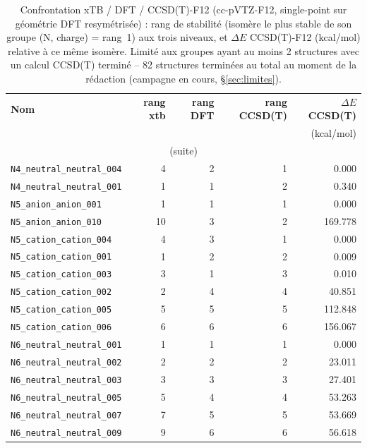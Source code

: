 {\scriptsize
\begin{longtable}{@{}p{4.0cm}rrrr@{}}
\caption{Confrontation xTB / DFT / CCSD(T)-F12 (cc-pVTZ-F12, single-point sur g\'eom\'etrie DFT resym\'etris\'ee) : rang de stabilit\'e (isom\`ere le plus stable de son groupe (N, charge) = rang~1) aux trois niveaux, et $\Delta E$ CCSD(T)-F12 (kcal/mol) relative \`a ce m\^eme isom\`ere. Limit\'e aux groupes ayant au moins 2 structures avec un calcul CCSD(T) termin\'e -- 82 structures termin\'ees au total au moment de la r\'edaction (campagne en cours, \S\ref{sec:limites}).}
\label{tab:ccsdt-comparison}\\
\toprule
\textbf{Nom} & \textbf{rang xtb} & \textbf{rang DFT} & \textbf{rang CCSD(T)} & \textbf{$\Delta E$ CCSD(T)} \\
 & & & & (kcal/mol) \\
\midrule\endfirsthead
\multicolumn{5}{c}{\small (suite)}\\ \toprule\endhead
\bottomrule\endfoot
\bottomrule\endlastfoot
\addlinespace
\texttt{N4\_neutral\_neutral\_004} & 4 & 2 & 1 & 0.000 \\
\texttt{N4\_neutral\_neutral\_001} & 1 & 1 & 2 & 0.340 \\
\addlinespace
\texttt{N5\_anion\_anion\_001} & 1 & 1 & 1 & 0.000 \\
\texttt{N5\_anion\_anion\_010} & 10 & 3 & 2 & 169.778 \\
\addlinespace
\texttt{N5\_cation\_cation\_004} & 4 & 3 & 1 & 0.000 \\
\texttt{N5\_cation\_cation\_001} & 1 & 2 & 2 & 0.009 \\
\texttt{N5\_cation\_cation\_003} & 3 & 1 & 3 & 0.010 \\
\texttt{N5\_cation\_cation\_002} & 2 & 4 & 4 & 40.851 \\
\texttt{N5\_cation\_cation\_005} & 5 & 5 & 5 & 112.848 \\
\texttt{N5\_cation\_cation\_006} & 6 & 6 & 6 & 156.067 \\
\addlinespace
\texttt{N6\_neutral\_neutral\_001} & 1 & 1 & 1 & 0.000 \\
\texttt{N6\_neutral\_neutral\_002} & 2 & 2 & 2 & 23.011 \\
\texttt{N6\_neutral\_neutral\_003} & 3 & 3 & 3 & 27.401 \\
\texttt{N6\_neutral\_neutral\_005} & 5 & 4 & 4 & 53.263 \\
\texttt{N6\_neutral\_neutral\_007} & 7 & 5 & 5 & 53.669 \\
\texttt{N6\_neutral\_neutral\_009} & 9 & 6 & 6 & 56.618 \\

\end{longtable}}
